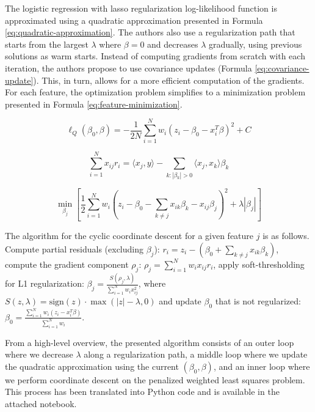 \documentclass[11pt]{article}
\begin{document}
The logistic regression with lasso regularization log-likelihood function is approximated using a quadratic approximation presented in Formula \ref{eq:quadratic-approximation}. The authors also use a regularization path that starts from the largest $\lambda$ where $\beta = 0$ and decreases $\lambda$ gradually, using previous solutions as warm starts. Instead of computing gradients from scratch with each iteration, the authors propose to use covariance updates (Formula \ref{eq:covariance-update}). This, in turn, allows for a more efficient computation of the gradients. For each feature, the optimization problem simplifies to a minimization problem presented in Formula \ref{eq:feature-minimization}.

\begin{equation}\label{eq:quadratic-approximation}
\ell_Q(\beta_0, \beta) = -\frac{1}{2N} \sum_{i=1}^{N} w_i (z_i - \beta_0 - x_i^T \beta)^2 + C
\end{equation}


\begin{equation}\label{eq:covariance-update}
\sum_{i=1}^{N} x_{ij} r_i = \langle x_j, y \rangle - \sum_{k: |\beta_k| > 0} \langle x_j, x_k \rangle \beta_k
\end{equation}

\begin{equation}\label{eq:feature-minimization}
    \min_{\beta_j} \left[ \frac{1}{2} \sum_{i=1}^{N} w_i \left( z_i - \beta_0 - \sum_{k \neq j} x_{ik} \beta_k - x_{ij} \beta_j \right)^2 + \lambda |\beta_j| \right]
\end{equation}


The algorithm for the cyclic coordinate descent for a given feature $j$ is as follows. Compute partial residuals (excluding $\beta_j$): $r_i = z_i - (\beta_0 + \sum_{k \neq j} x_{ik} \beta_k)$, compute the gradient component $\rho_j$: $\rho_j = \sum_{i=1}^{N} w_i x_{ij} r_i$, apply soft-thresholding for L1 regularization: $\beta_j = \frac{S(\rho_j, \lambda)}{\sum_{i=1}^{N} w_i x_{ij}^2}$, where $S(z, \lambda) = \text{sign}(z) \cdot \max(|z| - \lambda, 0)$ and update $\beta_0$ that is not regularized: $\beta_0 = \frac{\sum_{i=1}^{N} w_i (z_i - x_i^T \beta)}{\sum_{i=1}^{N} w_i}$.


From a high-level overview, the presented algorithm consists of an outer loop where we decrease $\lambda$ along a regularization path, a middle loop where we update the quadratic approximation using the current $(\beta_0, \beta)$, and an inner loop where we perform coordinate descent on the penalized weighted least squares problem. This process has been translated into Python code and is available in the attached notebook.
\end{document}
